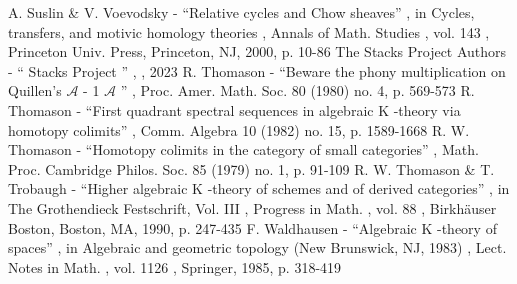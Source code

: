  A. Suslin \& V. Voevodsky - “Relative cycles and Chow sheaves” , in Cycles, transfers, and motivic homology theories , Annals of Math. Studies , vol. 143 , Princeton Univ. Press, Princeton, NJ, 2000, p. 10-86
 The Stacks Project Authors - “ Stacks Project ” , , 2023
 R. Thomason - “Beware the phony multiplication on Quillen’s $\mathcal{A}$ - 1 $\mathcal{A}$ ” , Proc. Amer. Math. Soc. 80 (1980) no. 4, p. 569-573
 R. Thomason - “First quadrant spectral sequences in algebraic K -theory via homotopy colimits” , Comm. Algebra 10 (1982) no. 15, p. 1589-1668
 R. W. Thomason - “Homotopy colimits in the category of small categories” , Math. Proc. Cambridge Philos. Soc. 85 (1979) no. 1, p. 91-109
 R. W. Thomason \& T. Trobaugh - “Higher algebraic K -theory of schemes and of derived categories” , in The Grothendieck Festschrift, Vol. III , Progress in Math. , vol. 88 , Birkhäuser Boston, Boston, MA, 1990, p. 247-435
 F. Waldhausen - “Algebraic K -theory of spaces” , in Algebraic and geometric topology (New Brunswick, NJ, 1983) , Lect. Notes in Math. , vol. 1126 , Springer, 1985, p. 318-419
